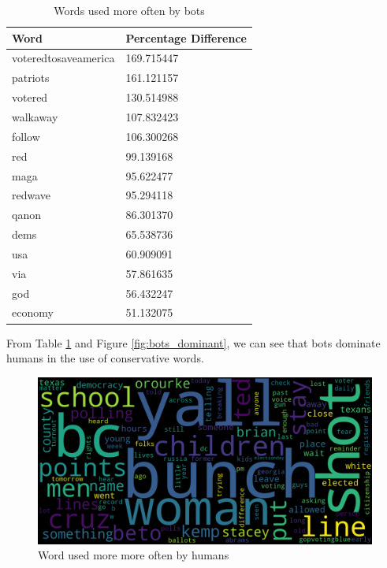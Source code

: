 \documentclass[letterpaper]{article}
\begin{document}
\begin{table}
    \centering
    \begin{tabular}{|l|l|}
    \hline
    \textbf{Word} & \textbf{Percentage Difference} \\ \hline
    voteredtosaveamerica & 169.715447 \\ \hline
    patriots & 161.121157 \\ \hline
    votered & 130.514988 \\ \hline
    walkaway & 107.832423 \\ \hline
    follow & 106.300268 \\ \hline
    red & 99.139168 \\ \hline
    maga & 95.622477 \\ \hline
    redwave & 95.294118 \\ \hline
    qanon & 86.301370 \\ \hline
    dems & 65.538736 \\ \hline
    usa & 60.909091 \\ \hline
    via & 57.861635 \\ \hline
    god & 56.432247 \\ \hline
    economy & 51.132075 \\ \hline
    \end{tabular}
    \caption{Words used more often by bots}
    \label{tab:bot-dominant-words}
\end{table}

From Table \ref{tab:bot-dominant-words} and Figure \ref{fig:bots_dominant}, we can see that bots dominate humans in the use of conservative words. 

\begin{figure}
    \includegraphics[width=\linewidth]{images/mostly_humans.png}
    \caption{Word used more more often by humans}
    \label{fig:humans_dominant}
\end{figure}
\end{document}
